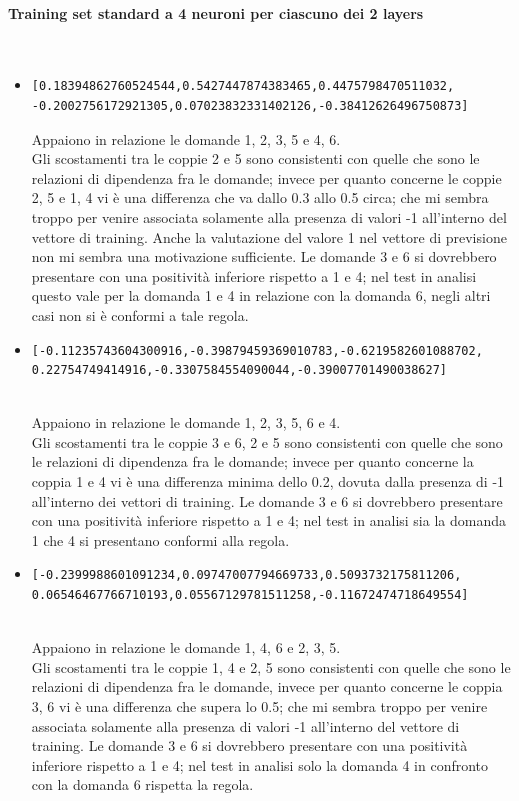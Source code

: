 \paragraph{Training set standard a 4 neuroni per ciascuno dei 2 layers}\mbox{}
\label{Training set standard a 4 neuroni per ciascuno dei 2 layers}
\\
\noindent
\begin{itemize}
\item \begin{verbatim}[0.18394862760524544,0.5427447874383465,0.4475798470511032,
-0.2002756172921305,0.07023832331402126,-0.38412626496750873] \end{verbatim}
Appaiono in relazione le domande 1, 2, 3, 5 e 4, 6.\\
Gli scostamenti tra le coppie 2 e 5 sono consistenti con quelle che sono le relazioni  di dipendenza fra le domande; invece per quanto concerne le coppie 2, 5 e 1, 4 vi \`e una differenza che va dallo 0.3 allo 0.5 circa; che mi sembra troppo per venire associata solamente alla presenza di valori -1 all'interno del vettore di training. Anche la valutazione del valore 1 nel vettore di previsione non mi sembra una motivazione sufficiente.
Le domande 3 e 6 si dovrebbero presentare con una positivit\`a inferiore rispetto a 1 e 4; nel test in analisi questo vale per la domanda 1 e 4 in relazione con la domanda 6, negli altri casi non si \`e conformi a tale regola.

\item \begin{verbatim}[-0.11235743604300916,-0.39879459369010783,-0.6219582601088702,
0.22754749414916,-0.3307584554090044,-0.39007701490038627] \end{verbatim}\\
Appaiono in relazione le domande 1, 2, 3, 5, 6 e 4.\\
Gli scostamenti tra le coppie 3 e 6, 2 e 5 sono consistenti con quelle che sono le relazioni di dipendenza fra le domande; invece per quanto concerne la coppia 1 e 4 vi \`e una differenza minima dello 0.2, dovuta dalla presenza di -1  all'interno dei vettori di training.
Le domande 3 e 6 si dovrebbero presentare con una positivit\`a inferiore rispetto a 1 e 4; nel test in analisi sia la domanda 1 che 4 si presentano conformi alla regola.

\item \begin{verbatim}[-0.2399988601091234,0.09747007794669733,0.5093732175811206,
0.06546467766710193,0.05567129781511258,-0.11672474718649554]\end{verbatim}\\
Appaiono in relazione le domande 1, 4, 6 e 2, 3, 5.\\
Gli scostamenti tra le  coppie 1, 4 e 2, 5 sono consistenti con quelle che sono le relazioni di dipendenza fra le domande, invece per quanto concerne le coppia 3, 6 vi \`e una differenza che supera lo 0.5; che mi sembra troppo per venire associata solamente alla presenza di valori -1 all'interno del vettore di training.
Le domande 3 e 6 si dovrebbero presentare con una positivit\`a inferiore rispetto a 1 e 4; nel test in analisi solo la domanda 4 in confronto con la domanda 6 rispetta la regola.


\end{itemize}
